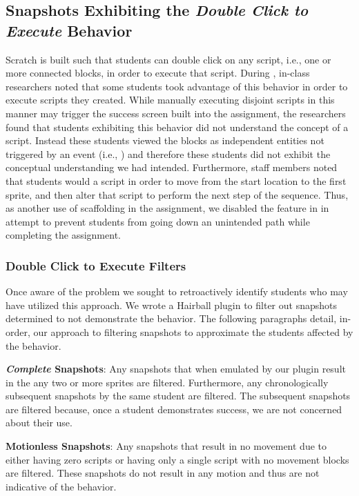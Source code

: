 \subsection{Snapshots Exhibiting the \emph{Double Click to Execute} Behavior}
Scratch is built such that students can double click on any script, i.e., one
or more connected blocks, in order to execute that script. During \sone{},
in-class researchers noted that some students took advantage of this behavior
in order to execute scripts they created. While manually executing disjoint
scripts in this manner may trigger the success screen built into the
assignment, the researchers found that students exhibiting this behavior did
not understand the concept of a script. Instead these students viewed the
blocks as independent entities not triggered by an event (i.e., \netclicked)
and therefore these students did not exhibit the conceptual understanding we
had intended. Furthermore, staff members noted that students would \dce{} a
script in order to move from the start location to the first sprite, and then
alter that script to perform the next step of the sequence. Thus, as another
use of scaffolding in the assignment, we disabled the \dce{} feature in \stwo{}
in attempt to prevent students from going down an unintended path while
completing the assignment.

\subsubsection{Double Click to Execute Filters}
Once aware of the problem we sought to retroactively identify students who may
have utilized this \dce{} approach. We wrote a Hairball plugin to filter out
snapshots determined to not demonstrate the \dce{} behavior. The following
paragraphs detail, in-order, our approach to filtering snapshots to approximate
the students affected by the \dce{} behavior.

\textbf{\emph{Complete} Snapshots}: Any snapshots that when emulated by our
plugin result in the \net{}  any two or more sprites are
filtered. Furthermore, any chronologically subsequent snapshots by the same
student are filtered. The subsequent snapshots are filtered because, once a
student demonstrates success, we are not concerned about their \dce{} use.

\textbf{Motionless Snapshots}: Any snapshots that result in no movement due to
either having zero scripts or having only a single \netclicked{} script with no
movement blocks are filtered. These snapshots do not result in any motion and
thus are not indicative of the \dce{} behavior.

